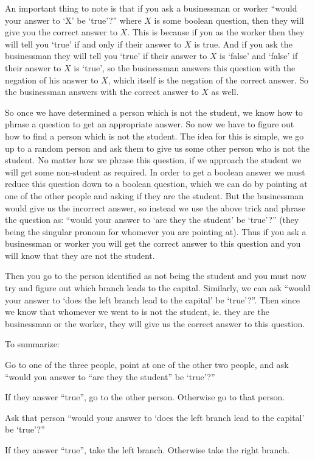 \documentclass[10pt]{article}
\begin{document}
\begin{blankpp}

    An important thing to note is that if you ask a businessman or worker ``would your answer to `X' be `true'?'' where $X$ is some boolean question, then they will give you the correct answer to $X$.
    This is because if you as the worker then they will tell you `true' if and only if their answer to $X$ is true.
    And if you ask the businessman they will tell you `true' if their answer to $X$ is `false' and `false' if their answer to $X$ is `true', so the businessman answers this question with the negation of his
    answer to $X$, which itself is the negation of the correct answer.
    So the businessman answers with the correct answer to $X$ as well.

    So once we have determined a person which is not the student, we know how to phrase a question to get an appropriate answer.
    So now we have to figure out how to find a person which is not the student.
    The idea for this is simple, we go up to a random person and ask them to give us some other person who is not the student.
    No matter how we phrase this question, if we approach the student we will get some non-student as required.
    In order to get a boolean answer we must reduce this question down to a boolean question, which we can do by pointing at one of the other people and asking if they are the student.
    But the businessman would give us the incorrect answer, so instead we use the above trick and phrase the question as: ``would your answer to `are they the student' be `true'?'' (they being the singular
    pronoun for whomever you are pointing at).
    Thus if you ask a businessman or worker you will get the correct answer to this question and you will know that they are not the student.

    Then you go to the person identified as not being the student and you must now try and figure out which branch leads to the capital.
    Similarly, we can ask ``would your answer to `does the left branch lead to the capital' be `true'?''.
    Then since we know that whomever we went to is not the student, ie. they are the businessman or the worker, they will give us the correct answer to this question.

    To summarize:
    \benum
        \item Go to one of the three people, point at one of the other two people, and ask ``would you answer to ``are they the student'' be `true'?''
        \item If they answer ``true'', go to the other person.
        Otherwise go to that person.
        \item Ask that person ``would your answer to `does the left branch lead to the capital' be `true'?''
        \item If they answer ``true'', take the left branch.
        Otherwise take the right branch.
    \eenum


\end{blankpp}
\end{document}
